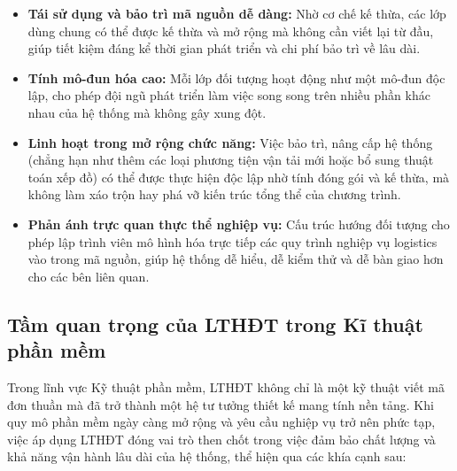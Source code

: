 \documentclass[12pt,a4paper]{article}
\begin{document}
\begin{itemize}[label={\scalebox{1.2}{$\circ$}}, leftmargin=2em]
	\item \textbf{Tái sử dụng và bảo trì mã nguồn dễ dàng:} Nhờ cơ chế kế thừa, các lớp dùng chung có thể được kế thừa và mở rộng mà không cần viết lại từ đầu, giúp tiết kiệm đáng kể thời gian phát triển và chi phí bảo trì về lâu dài.
	\item \textbf{Tính mô-đun hóa cao:} Mỗi lớp đối tượng hoạt động như một mô-đun độc lập, cho phép đội ngũ phát triển làm việc song song trên nhiều phần khác nhau của hệ thống mà không gây xung đột.
	\item \textbf{Linh hoạt trong mở rộng chức năng:} Việc bảo trì, nâng cấp hệ thống (chẳng hạn như thêm các loại phương tiện vận tải mới hoặc bổ sung thuật toán xếp đồ) có thể được thực hiện độc lập nhờ tính đóng gói và kế thừa, mà không làm xáo trộn hay phá vỡ kiến trúc tổng thể của chương trình.
	\item \textbf{Phản ánh trực quan thực thể nghiệp vụ:} Cấu trúc hướng đối tượng cho phép lập trình viên mô hình hóa trực tiếp các quy trình nghiệp vụ logistics vào trong mã nguồn, giúp hệ thống dễ hiểu, dễ kiểm thử và dễ bàn giao hơn cho các bên liên quan.
\end{itemize}

\subsection{Tầm quan trọng của LTHĐT trong Kĩ thuật phần mềm}

Trong lĩnh vực Kỹ thuật phần mềm, LTHĐT không chỉ là một kỹ thuật viết mã đơn thuần mà đã trở thành một hệ tư tưởng thiết kế mang tính nền tảng. Khi quy mô phần mềm ngày càng mở rộng và yêu cầu nghiệp vụ trở nên phức tạp, việc áp dụng LTHĐT đóng vai trò then chốt trong việc đảm bảo chất lượng và khả năng vận hành lâu dài của hệ thống, thể hiện qua các khía cạnh sau:
\end{document}
